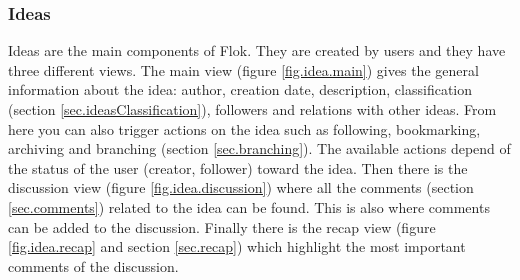 \documentclass[a4paper,12pt, oneside]{article}
\begin{document}
\subsubsection{Ideas}
Ideas are the main components of Flok.
They are created by users and they have three different views.
The main view (figure \ref{fig.idea.main}) gives the general information about the idea: author, creation date, description, classification (section \ref{sec.ideasClassification}), followers and relations with other ideas.
From here you can also trigger actions on the idea such as following, bookmarking, archiving and branching (section \ref{sec.branching}).
The available actions depend of the status of the user (creator, follower) toward the idea.
Then there is the discussion view (figure \ref{fig.idea.discussion}) where all the comments (section \ref{sec.comments}) related to the idea can be found.
This is also where comments can be added to the discussion.
Finally there is the recap view (figure \ref{fig.idea.recap} and section \ref{sec.recap}) which highlight the most important comments of the discussion.
\end{document}
